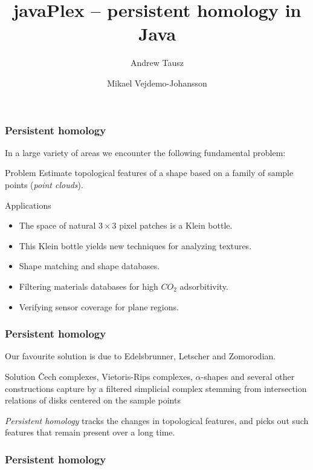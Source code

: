 \documentclass{beamer}
\begin{document}
\author{Andrew Tausz \and Mikael Vejdemo-Johansson}
\title{javaPlex -- persistent homology in Java}

\frame{\titlepage}

\begin{frame}
  \frametitle{Persistent homology}
  
  In a large variety of areas we encounter the following fundamental problem:

  \begin{block}{Problem}
    Estimate topological features of a shape based on a family of sample points (\emph{point clouds}).
  \end{block}
  \begin{block}{Applications}
    \begin{itemize}
    \item The space of natural $3\times3$ pixel patches is a Klein bottle.
    \item This Klein bottle yields new techniques for analyzing textures.
    \item Shape matching and shape databases.
    \item Filtering materials databases for high $CO_2$ adsorbitivity.
    \item Verifying sensor coverage for plane regions.
    \end{itemize}
  \end{block}
\end{frame}

\begin{frame}
  \frametitle{Persistent homology}
  
  Our favourite solution is due to Edelsbrunner, Letscher and Zomorodian.

  \begin{block}{Solution}
    \v Cech complexes, Vietoris-Rips complexes, $\alpha$-shapes and several other constructions capture by a filtered simplicial complex stemming from intersection relations of disks centered on the sample points

    \emph{Persistent homology} tracks the changes in topological features, and picks out such features that remain present over a long time.
  \end{block}
\end{frame}

\begin{frame}
  \frametitle{Persistent homology}
\end{frame}
\end{document}
